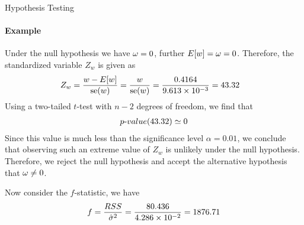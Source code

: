 %
\begin{frame}{Hypothesis Testing}
\framesubtitle{Example}
Under the null hypothesis we have $\omega=0$, further
    $E[w] = \omega = 0$. Therefore, the standardized variable $Z_{w}$ is
    given as
    \begin{align*}
    Z_{w} & = \frac{w - E[w]}{\operatorname{se}(w)} =
    \frac{w}{\operatorname{se}(w)} 
    = \frac{0.4164}{9.613 \times 10^{-3}} = 43.32
    \end{align*}
    Using a two-tailed $t$-test with $n-2$ degrees of freedom, we
    find that
    \begin{align*}
        {p\text{-}value}(43.32) \simeq 0
    \end{align*}
    Since this value is much less than the significance level $\alpha=0.01$, we conclude
    that observing such an extreme value of $Z_{w}$ is unlikely under the
    null hypothesis. Therefore, we reject the null hypothesis and accept
    the alternative hypothesis that $\omega\ne 0$.

    Now consider the $f$-statistic, we have
    \begin{align*}
        f = \frac{RSS}{\hat{\sigma}^2} = \frac{80.436}{4.286 \times
        10^{-2}} = 1876.71
    \end{align*}
\end{frame}


